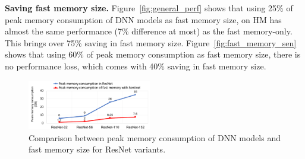 




\textbf{Saving fast memory size.} 
\textcolor{check}{Figure~\ref{fig:general_perf} shows that using 25\% of peak memory consumption of DNN models as fast memory size, \name on HM has almost the same performance (7\% difference at most) as the fast memory-only. 
This brings over 75\% saving in fast memory size.} 
Figure~\ref{fig:fast_memory_sen} shows that using 60\% of peak memory consumption as fast memory size, there is no performance loss, which comes with 40\% saving in fast memory size.


\begin{figure}
\centering
\includegraphics[width=0.48\textwidth]{figures/resnet_diff_input.pdf}
\vspace{-20pt}
\caption{Comparison between peak memory consumption of DNN models and fast memory size for ResNet variants.}
\vspace{-5pt}
\label{fig:mem_consumption}
\end{figure}



